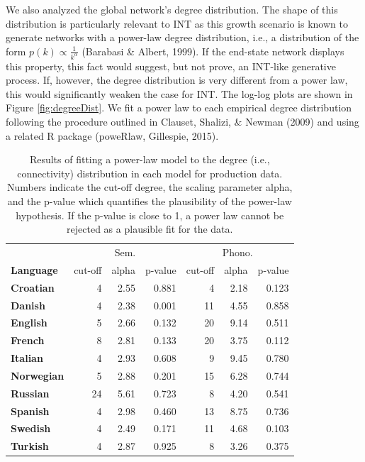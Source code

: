 \documentclass[english,,man,floatsintext]{apa6}
\begin{document}
We also analyzed the global network's degree distribution. The shape of this distribution is particularly relevant to INT as this growth scenario is known to generate networks with a power-law degree distribution, i.e., a distribution of the form \(p(k) \propto \frac{1}{k^{\alpha}}\) (Barabasi \& Albert, 1999). If the end-state network displays this property, this fact would suggest, but not prove, an INT-like generative process. If, however, the degree distribution is very different from a power law, this would significantly weaken the case for INT. The log-log plots are shown in Figure \ref{fig:degreeDist}. We fit a power law to each empirical degree distribution following the procedure outlined in Clauset, Shalizi, \& Newman (2009) and using a related R package (poweRlaw, Gillespie, 2015).

\begin{table}

\caption{\label{tab:powerLawProd}Results of fitting a power-law model to the degree (i.e., connectivity) distribution in each model for production data. Numbers indicate the cut-off degree, the scaling parameter alpha, and the p-value which quantifies the plausibility of the power-law hypothesis. If the p-value is close to 1, a power law cannot be rejected as a plausible fit for the data.}
\centering
\begin{tabular}[t]{>{\bfseries}lrrrrrr}
\toprule
\multicolumn{1}{c}{} & \multicolumn{3}{c}{Sem.} & \multicolumn{3}{c}{Phono.} \\
\cmidrule(l{3pt}r{3pt}){2-4} \cmidrule(l{3pt}r{3pt}){5-7}
Language & cut-off & alpha & p-value & cut-off & alpha & p-value\\
\midrule
Croatian & 4 & 2.55 & 0.881 & 4 & 2.18 & 0.123\\
Danish & 4 & 2.38 & 0.001 & 11 & 4.55 & 0.858\\
English & 5 & 2.66 & 0.132 & 20 & 9.14 & 0.511\\
French & 8 & 2.81 & 0.133 & 20 & 3.75 & 0.112\\
Italian & 4 & 2.93 & 0.608 & 9 & 9.45 & 0.780\\
Norwegian & 5 & 2.88 & 0.201 & 15 & 6.28 & 0.744\\
Russian & 24 & 5.61 & 0.723 & 8 & 4.20 & 0.541\\
Spanish & 4 & 2.98 & 0.460 & 13 & 8.75 & 0.736\\
Swedish & 4 & 2.49 & 0.171 & 11 & 4.68 & 0.103\\
Turkish & 4 & 2.87 & 0.925 & 8 & 3.26 & 0.375\\
\bottomrule
\end{tabular}
\end{table}
\end{document}
